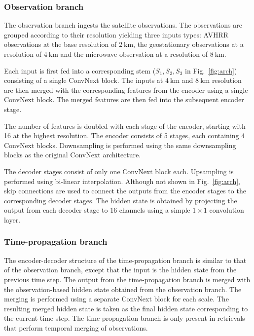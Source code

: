 \documentclass[11pt]{scrartcl}
\begin{document}
\subsubsection{Observation branch}

The observation branch ingests the satellite observations. The observations are
grouped according to their resolution yielding three inputs types: AVHRR
observations at the base resolution of $\SI{2}{\kilo \meter}$, the geostationary
observations at a resolution of $\SI{4}{\kilo \meter}$ and the microwave
observation at a resolution of $\SI{8}{\kilo \meter}$.

Each input is first fed into a corresponding stem ($S_1, S_2, S_3$ in
Fig.~\ref{fig:arch}) consisting of a single ConvNext block. The inputs at
$\SI{4}{\kilo \meter}$ and $\SI{8}{\kilo \meter}$ resolution are then merged
with the corresponding features from the encoder using a single ConvNext block.
The merged features are then fed into the subsequent encoder stage.

The number of features is doubled with each stage of the encoder, starting with
16 at the highest resolution. The encoder consists of 5 stages, each containing
4 ConvNext blocks. Downsampling is performed using the same downsampling blocks as
the original ConvNext architecture.

The decoder stages consist of only one ConvNext block each. Upsampling is
performed using bi-linear interpolation. Although not shown in
Fig.~\ref{fig:arch}, skip connections are used to connect the outputs from the
encoder stages to the corresponding decoder stages. The hidden state is obtained
by projecting the output from each decoder stage to 16 channels using a simple
$1 \times 1$ convolution layer.

\subsubsection{Time-propagation branch}


 The encoder-decoder structure of the time-propagation branch is similar to that
 of the observation branch, except that the input is the hidden state from the
 previous time step. The output from the time-propagation branch is merged with
 the observation-based hidden state obtained from the observation branch. The
 merging is performed using a separate ConvNext block for each scale. The
 resulting merged hidden state is taken as the final hidden state corresponding
 to the current time step. The time-propagation branch is only present in
 retrievals that perform temporal merging of observations.
\end{document}
